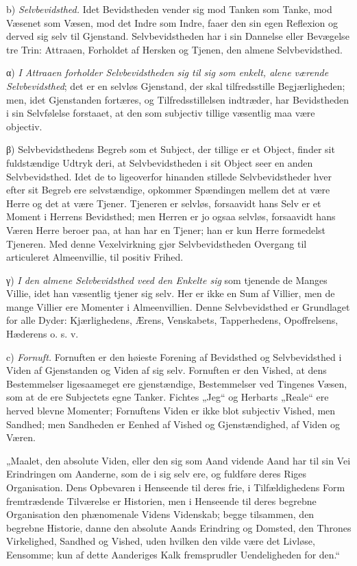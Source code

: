 \documentclass[12pt]{book}
\newcommand{\opage}[1]{\marginnote{\footnotesize\textit{[#1]}}}
\begin{document}
b) \emph{Selvbevidsthed.} Idet Bevidstheden vender sig mod Tanken som Tanke, mod
Væsenet som Væsen, mod det Indre som Indre, faaer den sin egen Reflexion og derved
sig selv til Gjenstand. Selvbevidstheden har i sin Dannelse eller Bevægelse tre
Trin: Attraaen, Forholdet af Hersken og Tjenen, den almene Selvbevidsthed.

α) \emph{I Attraaen forholder Selvbevidstheden sig til sig som enkelt, alene værende
Selvbevidsthed}; det er en selvløs Gjenstand, der skal tilfredsstille
Begjærligheden; men, idet Gjenstanden fortæres, og Tilfredsstillelsen indtræder, har
\opage{39} Bevidstheden i sin Selvfølelse forstaaet, at den som subjectiv tillige væsentlig maa
være objectiv.

β) Selvbevidsthedens Begreb som et Subject, der tillige er et Object, finder sit
fuldstændige Udtryk deri, at Selvbevidstheden i sit Object seer en anden
Selvbevidsthed. Idet de to ligeoverfor hinanden stillede Selvbevidstheder hver efter
sit Begreb ere selvstændige, opkommer Spændingen mellem det at være Herre og det at
være Tjener. Tjeneren er selvløs, forsaavidt hans Selv er et Moment i Herrens
Bevidsthed; men Herren er jo ogsaa selvløs, forsaavidt hans Væren Herre beroer paa,
at han har en Tjener; han er kun Herre formedelst Tjeneren. Med denne Vexelvirkning
gjør Selvbevidstheden Overgang til articuleret Almeenvillie, til positiv Frihed.

γ) \emph{I den almene Selvbevidsthed veed den Enkelte sig} som tjenende de Manges
Villie, idet han væsentlig tjener sig selv. Her er ikke en Sum af Villier, men de
mange Villier ere Momenter i Almeenvillien. Denne Selvbevidsthed er Grundlaget for
alle Dyder: Kjærlighedens, Ærens, Venskabets, Tapperhedens, Opoffrelsens, Hæderens
o. s. v.

c) \emph{Fornuft.} Fornuften er den høieste Forening af Bevidsthed og
Selvbevidsthed i Viden af Gjenstanden og Viden af sig selv. Fornuften er den Vished,
at dens Bestemmelser ligesaameget ere gjenstændige, Bestemmelser ved Tingenes
Væsen, som at de ere Subjectets egne Tanker. Fichtes „Jeg“ og Herbarts „Reale“ ere
herved blevne Momenter; Fornuftens Viden er ikke blot subjectiv Vished, men Sandhed;
men Sandheden er Eenhed af Vished og Gjenstændighed, af Viden og Væren.

„Maalet, den absolute Viden, eller den sig som Aand vidende Aand har til sin Vei
Erindringen om Aanderne, som de i sig selv ere, og fuldføre deres Riges
Organisation. Dens Opbevaren i Henseende til deres frie, i Tilfældighedens Form
fremtrædende Tilværelse er Historien, men i Henseende til deres begrebne
Organisation den phænomenale
\opage{40} Videns Videnskab; begge tilsammen, den begrebne Historie, danne den absolute Aands
Erindring og Domsted, den Thrones Virkelighed, Sandhed og Vished, uden hvilken den
vilde være det Livløse, Eensomme; kun af dette Aanderiges Kalk fremsprudler
Uendeligheden for den.“
\end{document}

